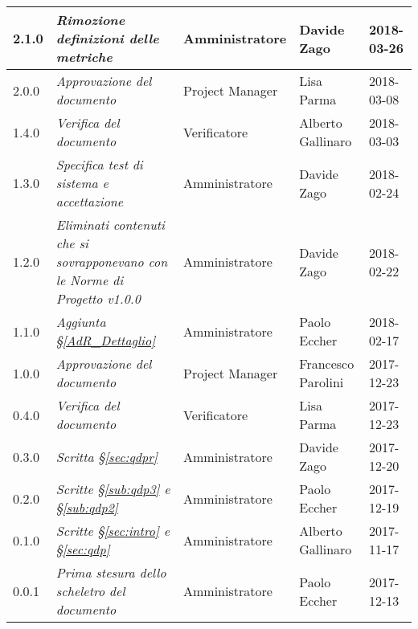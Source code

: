 \begin{longtable}[H]{C{2cm}|C{4cm}|C{3cm}|C{3cm}|R{2cm}}
		2.1.0 & \emph{Rimozione definizioni delle metriche} & Amministratore & Davide Zago & 2018-03-26 \\
		\hline

		2.0.0 & \emph{Approvazione del documento} & Project Manager & Lisa Parma & 2018-03-08 \\
		\hline
		
		1.4.0 & \emph{Verifica del documento} & Verificatore &  Alberto Gallinaro & 2018-03-03\\
		\hline
		
		1.3.0 & \emph{Specifica test di sistema e accettazione} & Amministratore &  Davide Zago & 2018-02-24 \\
		\hline
		
		1.2.0 & \emph{Eliminati contenuti che si sovrapponevano con le Norme di Progetto v1.0.0} & Amministratore &  Davide Zago & 2018-02-22 \\
		\hline
		
		1.1.0 & \emph{Aggiunta  §\ref{AdR_Dettaglio}} & Amministratore &  Paolo Eccher & 2018-02-17 \\
		\hline
		
		1.0.0 & \emph{Approvazione del documento} & Project Manager &  Francesco Parolini & 2017-12-23 \\
		\hline
		
		0.4.0  & \emph{Verifica del documento} & Verificatore & Lisa Parma & 2017-12-23 \\
		\hline
		
		0.3.0 & \emph{Scritta  §\ref{sec:qdpr}} & Amministratore & Davide Zago & 2017-12-20 \\
		\hline
		
		0.2.0 & \emph{Scritte §\ref{sub:qdp3} e §\ref{sub:qdp2}} &  Amministratore & Paolo Eccher & 2017-12-19 \\
		\hline
		
		0.1.0 & \emph{Scritte  §\ref{sec:intro} e §\ref{sec:qdp}} & Amministratore & Alberto Gallinaro & 2017-11-17 \\
		\hline
		
		0.0.1 & \emph{Prima stesura dello scheletro del documento} & Amministratore & Paolo Eccher &  2017-12-13 \\
		
	\end{longtable}


\clearpage